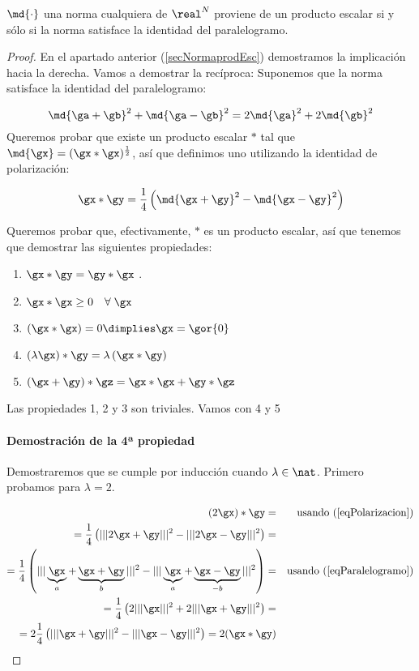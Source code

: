 \documentclass{apuntes}
\begin{document}
\begin{theorem}
$\md{\cdot}$ una norma cualquiera de $\real^N$ proviene de un producto escalar si y sólo si la norma satisface la identidad del paralelogramo. 
\end{theorem}

\begin{proof}
En el apartado anterior (\ref{secNormaprodEsc}) demostramos la implicación hacia la derecha. Vamos a demostrar la recíproca:
Suponemos que la norma satisface la identidad del paralelogramo:

\begin{equation}
 \md{\ga+\gb}^2 + \md{\ga-\gb}^2 = 2 \md{\ga}^2 + 2\md{\gb}^2 \label{eqParalelogramo}
\end{equation}
Queremos probar que existe un producto escalar $\ast$ tal que $\md{\gx} = (\gx\ast \gx)^\frac{1}{2}$, así que definimos uno utilizando la identidad de polarización: 

\begin{equation}
 \gx\ast\gy = \frac{1}{4} \left( \md{\gx+\gy} ^ 2 - \md{\gx-\gy} ^ 2\right) \label{eqPolarizacion}
 \end{equation}

Queremos probar que, efectivamente, $\ast$ es un producto escalar, así que tenemos que demostrar las siguientes propiedades:
\begin{enumerate}
 \item $\gx\ast\gy = \gy\ast\gx$ .
 \item $\gx\ast\gx \ge 0\quad \forall\; \gx$
 \item $(\gx\ast\gx) = 0 \dimplies \gx=\gor{0}$ 
 \item $(\lambda \gx) \ast \gy = \lambda\left(\gx\ast\gy\right)$
 \item $(\gx+\gy)\ast\gz =\gx\ast\gx + \gy\ast\gz $
\end{enumerate}

Las propiedades 1, 2 y 3 son triviales. Vamos con 4 y 5

\paragraph{Demostración de la 4ª propiedad}

Demostraremos que se cumple por inducción cuando $\lambda\in\nat$. Primero probamos para $\lambda = 2$.

\begin{align*}
(2\gx)\ast\gy = && \text{usando (\ref{eqPolarizacion})} \\
= \frac{1}{4} \left(|||2\gx+\gy |||^2 - |||2\gx-\gy |||^2\right) = && \\
= \frac{1}{4} \left(|||\underbrace{\gx}_a + \underbrace{\gx+\gy}_b|||^2 - |||\underbrace{\gx}_a+\underbrace{\gx-\gy}_{-b}|||^2\right) = && \text{usando (\ref{eqParalelogramo})} \\
= \frac{1}{4} \left(2|||\gx|||^2 + 2|||\gx + \gy|||^2\right) = && \\
= 2 \frac{1}{4} \left(|||\gx+\gy|||^2 - |||\gx-\gy|||^2\right) = 2 (\gx\ast\gy) &&
\end{align*}


\end{proof}
\end{document}
